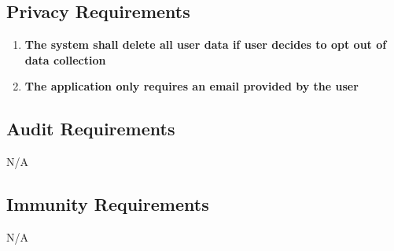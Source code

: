\documentclass{article}
\begin{document}
\subsection{Privacy Requirements}
\begin{enumerate}[{PR}1.]
    \item \textbf{The system shall delete all user data if user decides to opt out of data collection}
    \item \textbf{The application only requires an email provided by the user}
\end{enumerate}

\subsection{Audit Requirements}
N/A
\subsection{Immunity Requirements}
N/A
\end{document}
